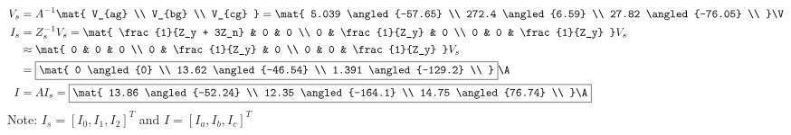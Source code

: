 \documentclass{homework}
\begin{document}
\begin{align*}
    V_s &= A^{-1} \mat{
        V_{ag} \\ V_{bg} \\ V_{cg}
    } = \mat{
        5.039 \angled{-57.65} \\
        272.4 \angled{6.59} \\
        27.82 \angled{-76.05} \\
    } \V \\
    I_s &= Z_s^{-1} V_s = \mat{
        \frac{1}{Z_y + 3Z_n} & 0 & 0 \\
        0 & \frac{1}{Z_y} & 0 \\
        0 & 0 & \frac{1}{Z_y}
    } V_s  \\
    &\approx \mat{
        0 & 0 & 0 \\
        0 & \frac{1}{Z_y} & 0 \\
        0 & 0 & \frac{1}{Z_y}
    } V_s \\
    &= \boxed{\mat{
        0 \angled{0} \\
        13.62 \angled{-46.54} \\
        1.391 \angled{-129.2} \\
    }} \A \\
    I & = A I_s = \boxed{\mat{
        13.86 \angled{-52.24} \\
        12.35 \angled{-164.1} \\
        14.75 \angled{76.74} \\
    } \A}
\end{align*}
Note: $I_s = [I_0, I_1, I_2]^T$ and $I = [I_a, I_b, I_c]^T$
\end{document}
